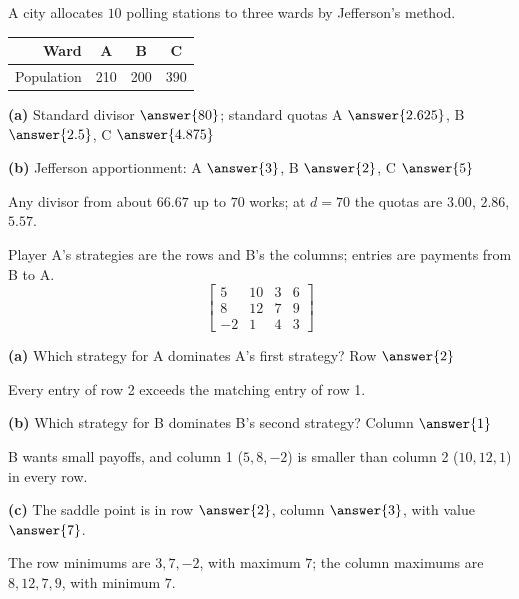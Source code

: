 \documentclass[12pt]{ximera}
\begin{document}
\begin{problem}
A city allocates $10$ polling stations to three wards by Jefferson's method.
\begin{center}
\begin{tabular}{r|ccc}
Ward & A & B & C\\\hline
Population & 210 & 200 & 390
\end{tabular}
\end{center}

\begin{prompt}
\textbf{(a)} Standard divisor $\answer{80}$; standard quotas A $\answer{2.625}$,
B $\answer{2.5}$, C $\answer{4.875}$
\end{prompt}

\begin{prompt}
\textbf{(b)} Jefferson apportionment: A $\answer{3}$, B $\answer{2}$, C $\answer{5}$
\begin{feedback}
Any divisor from about $66.67$ up to $70$ works; at $d=70$ the quotas are $3.00$, $2.86$,
$5.57$.
\end{feedback}
\end{prompt}
\end{problem}

\begin{problem}
Player A's strategies are the rows and B's the columns; entries are payments from B to A.
\[
\begin{bmatrix} 5 & 10 & 3 & 6\\ 8 & 12 & 7 & 9\\ -2 & 1 & 4 & 3 \end{bmatrix}
\]

\begin{prompt}
\textbf{(a)} Which strategy for A dominates A's first strategy? Row $\answer{2}$
\begin{feedback}
Every entry of row 2 exceeds the matching entry of row 1.
\end{feedback}
\end{prompt}

\begin{prompt}
\textbf{(b)} Which strategy for B dominates B's second strategy? Column $\answer{1}$
\begin{feedback}
B wants small payoffs, and column 1 ($5,8,-2$) is smaller than column 2 ($10,12,1$) in
every row.
\end{feedback}
\end{prompt}

\begin{prompt}
\textbf{(c)} The saddle point is in row $\answer{2}$, column $\answer{3}$, with value
$\answer{7}$.
\begin{feedback}
The row minimums are $3,7,-2$, with maximum $7$; the column maximums are $8,12,7,9$, with
minimum $7$.
\end{feedback}
\end{prompt}
\end{problem}
\end{document}

